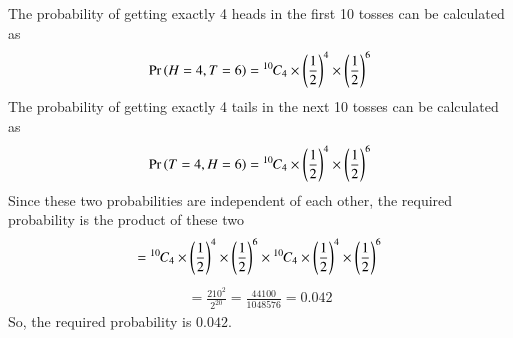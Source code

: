 
The probability of getting exactly 4 heads in the first 10 tosses can be calculated as
\begin{align}
    \Pr\left(H=4,T=6\right)={{}^{10}\mkern-1muC_{4}} \times {\left(\frac{1}{2}\right)}^4 \times {\left(\frac{1}{2}\right)}^6
\end{align}
The probability of getting exactly 4 tails in the next 10 tosses can be calculated as
\begin{align}
    \Pr\left(T=4,H=6\right)={{}^{10}\mkern-1muC_{4}} \times {\left(\frac{1}{2}\right)}^4 \times {\left(\frac{1}{2}\right)}^6
\end{align}
Since these two probabilities are independent of each other, the required probability is the product of these two
\begin{align}
    ={{}^{10}\mkern-1muC_{4}} \times {\left(\frac{1}{2}\right)}^4 \times {\left(\frac{1}{2}\right)}^6 \times {{}^{10}\mkern-1muC_{4}} \times {\left(\frac{1}{2}\right)}^4 \times {\left(\frac{1}{2}\right)}^6
\end{align}
\begin{align}
    =\frac{210^2}{2^{20}}=\frac{44100}{1048576}=0.042
\end{align}
So, the required probability is $0.042$.
